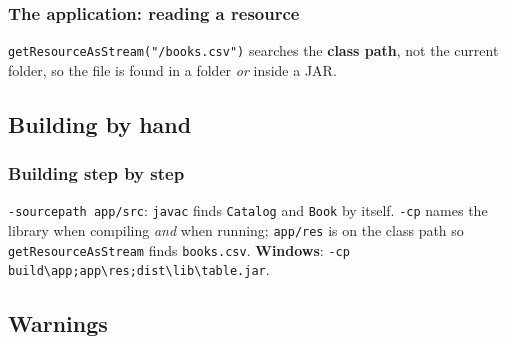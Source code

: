 \documentclass[aspectratio=169,10pt,compress]{beamer}
\newcommand{\win}{\textbf{Windows}}
\begin{document}
\begin{frame}[t,fragile] \frametitle{The application: reading a resource}

  \vspace{0.1em}
  \small \texttt{getResourceAsStream("/books.csv")} searches the \textbf{class path}, not the current folder,
  so the file is found in a folder \emph{or} inside a JAR.
\end{frame}

\subsection[By hand]{Building by hand}




\begin{frame}[t,fragile] \frametitle{Building step by step}

  \vspace{0.1em}
  \small
  \texttt{-sourcepath app/src}: \texttt{javac} finds \texttt{Catalog} and \texttt{Book} by itself. \texttt{-cp} names the library
  when compiling \emph{and} when running; \texttt{app/res} is on the class path so \texttt{getResourceAsStream} finds \texttt{books.csv}.
  \win: \texttt{-cp build\textbackslash app;app\textbackslash res;dist\textbackslash lib\textbackslash table.jar}.
\end{frame}


\subsection[Lint]{Warnings}
\end{document}
